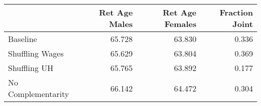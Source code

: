 \begin{tabular}{lrrr}
\toprule
{} & Ret Age Males & Ret Age Females & Fraction Joint \\
\midrule
Baseline           &        65.728 &          63.830 &          0.336 \\
Shuffling Wages    &        65.629 &          63.804 &          0.369 \\
Shuffling UH       &        65.765 &          63.892 &          0.177 \\
No Complementarity &        66.142 &          64.472 &          0.304 \\
\bottomrule
\end{tabular}
